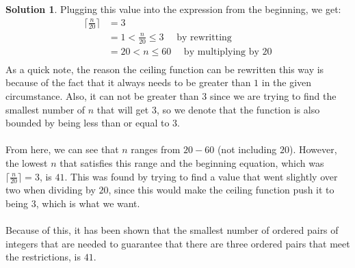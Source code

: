 \documentclass{article}
\theoremstyle{definition}
\newtheorem*{solution}{Solution}
\begin{document}
\begin{solution}
Plugging this value into the expression from the beginning, we get:
\begin{align*}
\lceil \frac{n}{20}  \rceil &= 3\\
&= 1 < \frac{n}{20} \leqslant 3 \quad \mbox{ by rewritting}\\
&= 20 < n \leqslant 60 \quad \mbox{ by multiplying by $20$}\\
\end{align*}
As a quick note, the reason the ceiling function can be rewritten this way is because of the fact that it always needs to be greater than $1$ in the given circumstance. Also, it can not be greater than $3$ since we are trying to find the smallest number of $n$ that will get $3$, so we denote that the function is also bounded by being less than or equal to $3$.
\\\\
From here, we can see that $n$ ranges from $20-60$ (not including $20$). However, the lowest $n$ that satisfies this range and the beginning equation, which was $\lceil \frac{n}{20}  \rceil = 3$, is $41$. This was found by trying to find a value that went slightly over two when dividing by $20$, since this would make the ceiling function push it to being $3$, which is what we want.\\\\
Because of this, it has been shown that the smallest number of ordered pairs of integers that are needed to guarantee that there are three ordered pairs that meet the restrictions, is $41$.
\end{solution}
\end{document}
